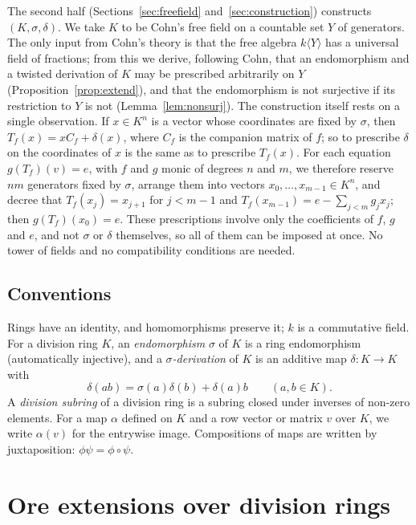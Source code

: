 \documentclass[11pt]{amsart}
\theoremstyle{plain}
\theoremstyle{definition}
\theoremstyle{remark}
\newcommand{\free}[1]{k\langle #1\rangle}
\begin{document}
The second half (Sections~\ref{sec:freefield} and~\ref{sec:construction}) constructs $(K,\sigma,\delta)$. We take $K$ to be Cohn's free field on a countable set $Y$ of generators. The only input from Cohn's theory is that the free algebra $\free Y$ has a universal field of fractions; from this we derive, following Cohn, that an endomorphism and a twisted derivation of $K$ may be prescribed arbitrarily on $Y$ (Proposition~\ref{prop:extend}), and that the endomorphism is not surjective if its restriction to $Y$ is not (Lemma~\ref{lem:nonsurj}). The construction itself rests on a single observation. If $x\in K^n$ is a vector whose coordinates are fixed by $\sigma$, then $T_f(x)=xC_f+\delta(x)$, where $C_f$ is the companion matrix of $f$; so to prescribe $\delta$ on the coordinates of $x$ is the same as to prescribe $T_f(x)$. For each equation $g(T_f)(v)=e$, with $f$ and $g$ monic of degrees $n$ and $m$, we therefore reserve $nm$ generators fixed by $\sigma$, arrange them into vectors $x_0,\dots,x_{m-1}\in K^n$, and decree that $T_f(x_j)=x_{j+1}$ for $j<m-1$ and $T_f(x_{m-1})=e-\sum_{j<m}g_jx_j$; then $g(T_f)(x_0)=e$. These prescriptions involve only the coefficients of $f$, $g$ and $e$, and not $\sigma$ or $\delta$ themselves, so all of them can be imposed at once. No tower of fields and no compatibility conditions are needed.

\subsection*{Conventions}
Rings have an identity, and homomorphisms preserve it; $k$ is a commutative field. For a division ring $K$, an \emph{endomorphism} $\sigma$ of $K$ is a ring endomorphism (automatically injective), and a \emph{$\sigma$-derivation} of $K$ is an additive map $\delta\colon K\to K$ with
\[
\delta(ab)=\sigma(a)\delta(b)+\delta(a)b\qquad(a,b\in K).
\]
A \emph{division subring} of a division ring is a subring closed under inverses of non-zero elements. For a map $\alpha$ defined on $K$ and a row vector or matrix $v$ over $K$, we write $\alpha(v)$ for the entrywise image. Compositions of maps are written by juxtaposition: $\phi\psi=\phi\circ\psi$.

\section{Ore extensions over division rings}\label{sec:ore}
\end{document}
